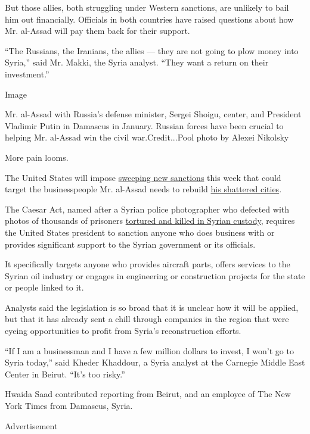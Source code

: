 But those allies, both struggling under Western sanctions, are unlikely
to bail him out financially. Officials in both countries have raised
questions about how Mr. al-Assad will pay them back for their support.

``The Russians, the Iranians, the allies --- they are not going to plow
money into Syria,'' said Mr. Makki, the Syria analyst. ``They want a
return on their investment.''

Image

Mr. al-Assad with Russia's defense minister, Sergei Shoigu, center, and
President Vladimir Putin in Damascus in January. Russian forces have
been crucial to helping Mr. al-Assad win the civil war.Credit...Pool
photo by Alexei Nikolsky

More pain looms.

The United States will impose
\href{https://www.nytimes3xbfgragh.onion/2019/12/16/us/politics/us-syria-sanctions-war-crimes.html}{sweeping
new sanctions} this week that could target the businesspeople Mr.
al-Assad needs to rebuild
\href{https://www.nytimes3xbfgragh.onion/2019/08/20/world/middleeast/syria-recovery-aleppo-douma.html}{his
shattered cities}.

The Caesar Act, named after a Syrian police photographer who defected
with photos of thousands of prisoners
\href{https://www.nytimes3xbfgragh.onion/2019/05/11/world/middleeast/syria-torture-prisons.html}{tortured
and killed in Syrian custody}, requires the United States president to
sanction anyone who does business with or provides significant support
to the Syrian government or its officials.

It specifically targets anyone who provides aircraft parts, offers
services to the Syrian oil industry or engages in engineering or
construction projects for the state or people linked to it.

Analysts said the legislation is so broad that it is unclear how it will
be applied, but that it has already sent a chill through companies in
the region that were eyeing opportunities to profit from Syria's
reconstruction efforts.

``If I am a businessman and I have a few million dollars to invest, I
won't go to Syria today,'' said Kheder Khaddour, a Syria analyst at the
Carnegie Middle East Center in Beirut. ``It's too risky.''

Hwaida Saad contributed reporting from Beirut, and an employee of The
New York Times from Damascus, Syria.

Advertisement

